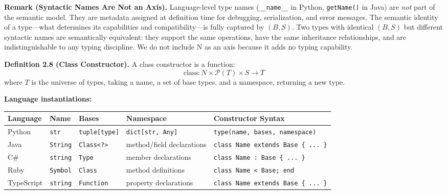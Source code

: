 \textbf{Remark (Syntactic Names Are Not an Axis).} Language-level type names (\texttt{\_\_name\_\_} in Python, \texttt{getName()} in Java) are \emph{not} part of the semantic model. They are metadata assigned at definition time for debugging, serialization, and error messages. The semantic identity of a type---what determines its capabilities and compatibility---is fully captured by $(B, S)$. Two types with identical $(B, S)$ but different syntactic names are semantically equivalent: they support the same operations, have the same inheritance relationships, and are indistinguishable to any typing discipline. We do not include N as an axis because it adds no typing capability.

\textbf{Definition 2.8 (Class Constructor).} A class constructor is a
function: \[\text{class}: N \times \mathcal{P}(T) \times S \to T\] where
\(T\) is the universe of types, taking a name, a set of base types, and
a namespace, returning a new type.

\textbf{Language instantiations:}

\small
\begin{longtable}[]{@{}
  >{\raggedright\arraybackslash}p{}
  >{\raggedright\arraybackslash}p{}
  >{\raggedright\arraybackslash}p{}
  >{\raggedright\arraybackslash}p{}
  >{\raggedright\arraybackslash}p{}@{}}
\toprule\noalign{}
\begin{minipage}[b]{\linewidth}\raggedright
Language
\end{minipage} & \begin{minipage}[b]{\linewidth}\raggedright
Name
\end{minipage} & \begin{minipage}[b]{\linewidth}\raggedright
Bases
\end{minipage} & \begin{minipage}[b]{\linewidth}\raggedright
Namespace
\end{minipage} & \begin{minipage}[b]{\linewidth}\raggedright
Constructor Syntax
\end{minipage} \\
\midrule\noalign{}
\endhead
\bottomrule\noalign{}
\endlastfoot
Python & \texttt{str} & \texttt{tuple{[}type{]}} &
\texttt{dict{[}str,\ Any{]}} &
\texttt{type(name,\ bases,\ namespace)} \\
Java & \texttt{String} & \texttt{Class\textless{}?\textgreater{}} &
method/field declarations &
\texttt{class\ Name\ extends\ Base\ \{\ ...\ \}} \\
C\# & \texttt{string} & \texttt{Type} & member declarations &
\texttt{class\ Name\ :\ Base\ \{\ ...\ \}} \\
Ruby & \texttt{Symbol} & \texttt{Class} & method definitions &
\texttt{class\ Name\ \textless{}\ Base;\ end} \\
TypeScript & \texttt{string} & \texttt{Function} & property declarations
& \texttt{class\ Name\ extends\ Base\ \{\ ...\ \}} \\
\end{longtable}

